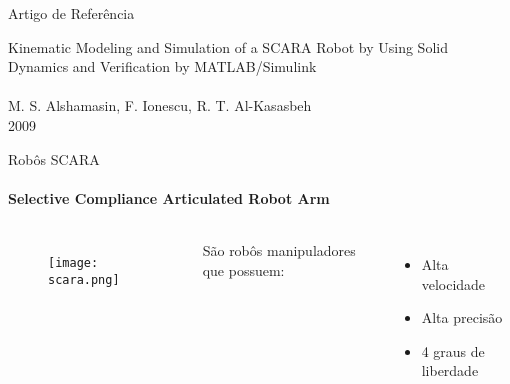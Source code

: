 \begin{frame}[t]{Artigo de Referência} 
    \begin{center}
        \huge 
        Kinematic Modeling and Simulation of a SCARA Robot by Using Solid Dynamics and Verification by
        MATLAB/Simulink\\
        \!
        \\
        \normalsize
        M. S. Alshamasin, F. Ionescu, R. T. Al-Kasasbeh\\
        2009
        
    \end{center}
\end{frame}
\begin{frame}[c]{Robôs SCARA}
    \framesubtitle{Selective Compliance Articulated Robot Arm} 

    \begin{columns}

        \begin{figure}
            \texttt{[image: scara.png]}
        \end{figure}


        \Large
        São robôs manipuladores que possuem:
        \begin{itemize}
            \item Alta velocidade
            \item Alta precisão
            \item 4 graus de liberdade
        \end{itemize}
    \end{columns}



\end{frame}

